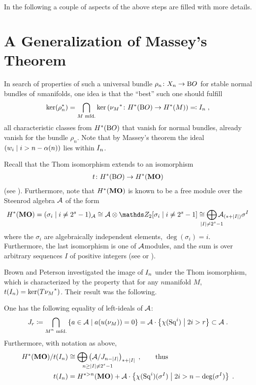 In the following a couple of aspects of the above steps are filled
with more details.


\section*{A Generalization of Massey's Theorem}
In search of properties of such a universal bundle
$\rho_n\colon X_n\to\mathrm{B}O$ for stable normal bundles of $n$\nbd{}manifolds,
one idea is that the \enquote{best} such one should fulfill
\begin{gather*}
  \ker({\rho}^*_n)
  = \bigcap_{\text{$M$ mfd.}}
  \ker\left({\nu_{M}}^*\colon H^*(\mathrm{B}O)\to H^*(M)\right)
  \eqqcolon I_{n}
  \;,
\end{gather*}
\idest all characteristic classes from $H^*(\mathrm{B}O)$ that vanish for
normal bundles, already vanish for the bundle $\rho_n$.
Note that by Massey's theorem the ideal
$\left(w_{i}\;\middle|\; i>n-\alpha(n)\right)$ lies within $I_{n}$.

\begin{Rem*}
Recall that the Thom isomorphism extends to an isomorphism
\begin{gather*}
  t\colon H^*(\mathrm{B}O) \to H^*(\bm{\mathrm{MO}})
\end{gather*}
(see \forexample \cite{milnor}).
Furthermore, note that $H^*(\bm{\mathrm{MO}})$ is known to be a free module
over the Steenrod algebra $\mathcal{A}$ of the form
\begin{gather*}
  \H^*(\MOspec)
  = (\sigma_i\mid i\neq 2^s-1)_{\A}
  \cong \A\otimes \Zmod2[\sigma_i\mid i\neq 2^s-1]
  \cong \bigoplus_{\mathclap{\Deg{I}\neq 2^s-1}}
  \A_{(*+\Deg{I})}\sigma^I
\end{gather*}
where the $\sigma_i$ are algebraically independent elements,
$\deg(\sigma_i)=i$.
Furthermore, the last isomorphism is one of $\mathcal{A}$\nbd{}modules, and the sum
is over arbitrary sequences $I$ of positive integers
(see \forexample \cite[p.~82]{immersionconj} or
\cite[Chap.~20]{switzer}).
\end{Rem*}

Brown and Peterson investigated the image of $I_{n}$ under the Thom
isomorphism, which is characterized by the property that for any
$n$\nbd{}manifold $M$, $t(I_{n})=\ker({T{\nu_{M}}}^*)$.
Their result was the following.
\begin{Thm*}
  One has the following equality of left-ideals of $\mathcal{A}$:
  \begin{gather*}
    J_{r}
    \coloneqq \bigcap_{\text{$M^n$ mfd.}}
    \left\{ a\in\mathcal{A} \;\middle|\; a({u}(\nu_{M})) = 0 \right\}
    = \mathcal{A} \cdot \left\{\chi(\mathrm{Sq}^{i}) \;\middle|\; 2i>r\right\}
    \subset \mathcal{A}
    \;.
  \end{gather*}
  Furthermore, with notation as above,
  \begin{align*}
    \H^*(\MOspec)/\thomiso(\I n)
    &\cong \bigoplus_{\mathrlap{n\geq\Deg{I}\neq 2^s-1}}
      \left( \A / \J{n-\Deg{I}} \right)_{*+\Deg{I}}
      \;,\qquad\text{thus}\\
    \thomiso(\I n)
    &= \H^{*>n}(\MOspec)
    + \A\cdot \left\{
      \antipode(\Sq i)(\sigma^I) \middlemid 2i>n-\deg(\sigma^I)
    \right\}
      \;.
  \end{align*}
\end{Thm*}

